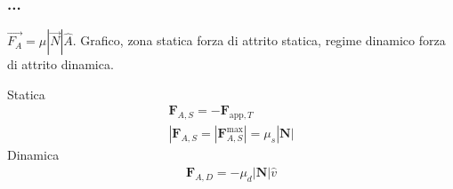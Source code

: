 \subsubsection*{...}
$\overrightarrow{F_A} = \mu|\overrightarrow{N}|\hat{A}$. Grafico, zona statica
forza di attrito statica, regime dinamico forza di attrito dinamica.

Statica
\begin{align}
    \mathbf{F}_{A,S} = -\mathbf{F}_{\text{app}, T}\\
    |\mathbf{F}_{A,S} = |\mathbf{F}_{A,S}^\text{max}| = \mu_s|\mathbf{N}|
\end{align}
Dinamica
\begin{align}
    \mathbf{F}_{A,D} = -\mu_d|\mathbf{N}|\hat{v}
\end{align}